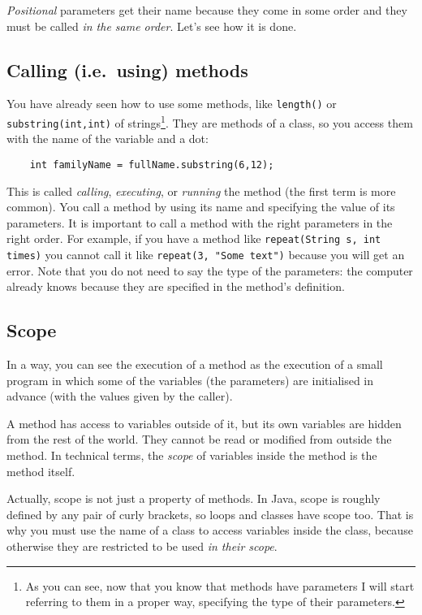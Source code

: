 \emph{Positional} parameters get their name because they come in some
order and they must be called \emph{in the same order}. Let's see how
it is done. 

\subsection{Calling (i.e.~using) methods}
\label{sec:using}

You have already seen how to use some methods, like
\verb+length()+ or \verb+substring(int,int)+ of strings\footnote{As
  you can see, now that you know that methods have parameters I will
  start referring to them in a proper way, specifying the type of
  their parameters.}. They are methods of a
class, so you access them with the name of the variable and a dot: 

\begin{verbatim}
    int familyName = fullName.substring(6,12);
\end{verbatim}

This is called \emph{calling}, \emph{executing}, or \emph{running} the
method (the first term is more common). 
You call a method by using its name and specifying the value of its
parameters. 
It is important to call a
method with the right parameters in the right order. For example, if
you have a method like \verb+repeat(String s, int times)+ you 
cannot call it like \verb+repeat(3, "Some text")+ because you will get
an error. Note that you do not need to say the type of the
parameters: the computer already knows because they are specified in
the method's definition. 

\subsection{Scope}

In a way, you can see the execution of a method as the execution of a
small program in which some of the variables (the parameters) are
initialised in advance (with the values given by the caller). 

A method has access to variables outside of it, but its own variables
are hidden from the rest of the world. They cannot be read or modified
from outside the method. In technical terms, the \emph{scope} of
variables inside the method is the method itself. 

Actually, scope is not just a property of methods. In Java, scope is
roughly defined by any pair of curly brackets, so loops and classes
have scope too. That is why you must use the name of a class to access
variables inside the class, because otherwise they are restricted to
be used \emph{in their scope}. 

